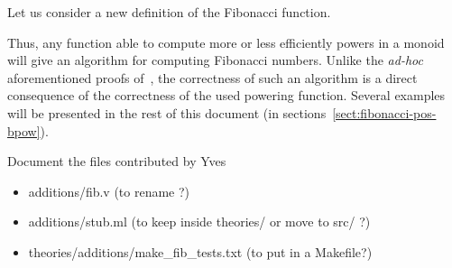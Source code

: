 Let us consider a new definition of the Fibonacci function.



Thus, any function able to compute more or less efficiently powers in a monoid will
give an algorithm for computing Fibonacci numbers. Unlike the \emph{ad-hoc} aforementioned proofs of~\cite{BC04}, the correctness of such an algorithm is a direct consequence
of the correctness of the used powering function.
Several examples will be presented in the rest of this document
(in sections~\vref{sect:fibonacci-pos-bpow}).










\begin{todo}
Document the files contributed by Yves
\begin{itemize}
\item additions/fib.v (to rename ?)
\item additions/stub.ml (to keep inside theories/ or move to src/ ?)
\item theories/additions/make\_fib\_tests.txt (to put in a Makefile?)
\end{itemize}
\end{todo}






